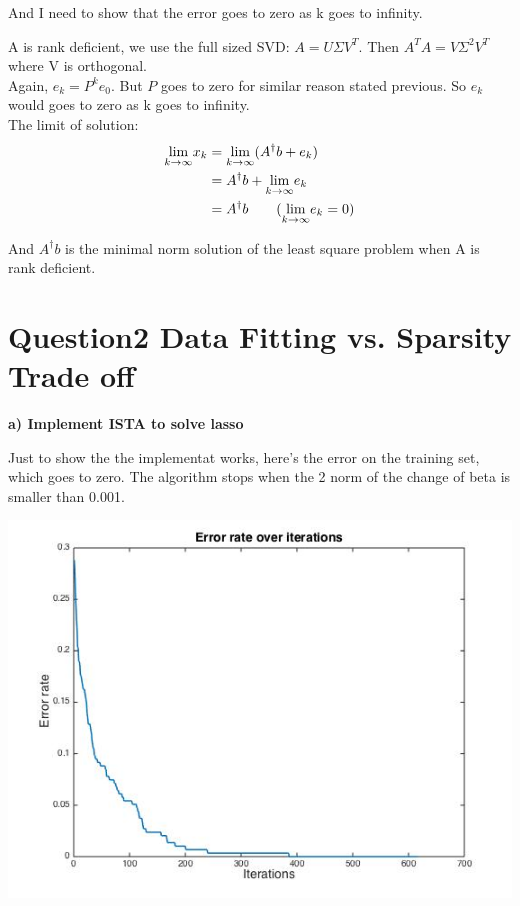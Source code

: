 \documentclass[paper=a4, fontsize=11pt]{scrartcl} %
\numberwithin{equation}{section} %
\numberwithin{figure}{section} %
\numberwithin{table}{section} %
\begin{document}
And I need to show that the error goes to zero as k goes to infinity. 

A is rank deficient, we use the full sized SVD: $A = U \Sigma V^T$. Then $A^T A = V \Sigma^2 V^T$ where V is orthogonal. \\

Again, $e_k = P^k e_0$. But $P$ goes to zero for similar reason stated previous. So $e_k$ would goes to zero as k goes to infinity. \\

The limit of solution: 
\begin{align*}
\underset{k \to \infty}{\lim} x_k &= \underset{k \to \infty}{\lim} (A^\dagger b + e_k) \\
& = A^\dagger b + \underset{k \to \infty}{\lim} e_k \\
& = A^\dagger b  \tag{$\underset{k \to \infty}{\lim} e_k =0$}
\end{align*}

And $A^\dagger b $ is the minimal norm solution of the least square problem when A is rank deficient. 

\newpage
\section*{Question2 Data Fitting vs. Sparsity Trade off}

\textbf{a) Implement ISTA to solve lasso}


Just to show the the implementat works, here's the error on the training set, which goes to zero. The algorithm stops when the 2 norm of the change of beta  is smaller than 0.001. 

\begin{center}
\includegraphics[scale=.5]{hw6_2a_error.jpg}
\end{center}
\end{document}
